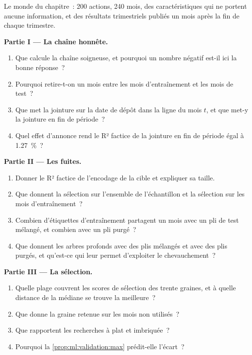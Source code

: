 \begin{problem}\label{pb:ml:validation:1}
Le monde du chapitre~: 200 actions, 240 mois, des caractéristiques qui ne portent aucune information, et des résultats trimestriels
publiés un mois après la fin de chaque trimestre.

\medskip\noindent\textbf{Partie I --- La chaîne honnête.}
\begin{enumerate}
\item Que calcule la chaîne soigneuse, et pourquoi un nombre négatif est-il ici la bonne réponse~?
\item Pourquoi retire-t-on un mois entre les mois d'entraînement et les mois de test~?
\item Que met la jointure sur la date de dépôt dans la ligne du mois $t$, et que met-y la jointure en fin de période~?
\item Quel effet d'annonce rend le R² factice de la jointure en fin de période égal à 1.27~\%~?
\end{enumerate}

\medskip\noindent\textbf{Partie II --- Les fuites.}
\begin{enumerate}[resume]
\item Donner le R² factice de l'encodage de la cible et expliquer sa taille.
\item Que donnent la sélection sur l'ensemble de l'échantillon et la sélection sur les mois d'entraînement~?
\item Combien d'étiquettes d'entraînement partagent un mois avec un pli de test mélangé, et combien avec un pli purgé~?
\item Que donnent les arbres profonds avec des plis mélangés et avec des plis purgés, et qu'est-ce qui leur permet d'exploiter le chevauchement~?
\end{enumerate}

\medskip\noindent\textbf{Partie III --- La sélection.}
\begin{enumerate}[resume]
\item Quelle plage couvrent les scores de sélection des trente graines, et à quelle distance de la médiane se trouve la meilleure~?
\item Que donne la graine retenue sur les mois non utilisés~?
\item Que rapportent les recherches à plat et imbriquée~?
\item Pourquoi la \cref{prop:ml:validation:max} prédit-elle l'écart~?
\end{enumerate}


\end{problem}
